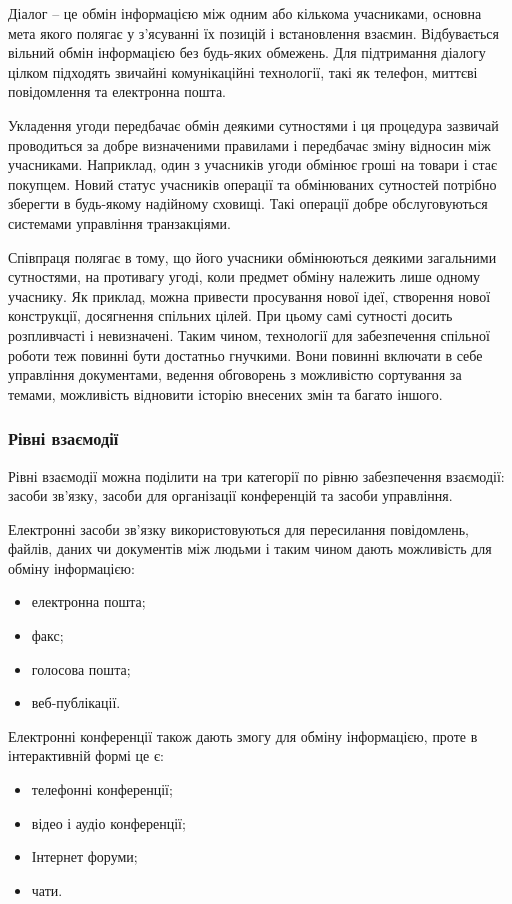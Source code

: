 \par Діалог -- це обмін інформацією між одним або кількома учасниками, основна мета якого полягає у з'ясуванні їх позицій і встановлення взаємин. 
Відбувається вільний обмін інформацією без будь-яких обмежень. 
Для підтримання діалогу цілком підходять звичайні комунікаційні технології, такі як телефон, миттєві повідомлення та електронна пошта.
\par Укладення угоди передбачає обмін деякими сутностями і ця процедура зазвичай проводиться за добре визначеними правилами і передбачає зміну відносин між учасниками. Наприклад, один з учасників угоди обмінює гроші на товари і стає покупцем. Новий статус учасників операції та обмінюваних сутностей потрібно зберегти в будь-якому надійному сховищі. Такі операції добре обслуговуються системами управління транзакціями. 
\par Співпраця полягає в тому, що його учасники обмінюються деякими загальними сутностями, на противагу угоді, коли предмет обміну належить лише одному учаснику. 
Як приклад, можна привести просування нової ідеї, створення нової конструкції, досягнення спільних цілей. 
При цьому самі сутності досить розпливчасті і невизначені. 
Таким чином, технології для забезпечення спільної роботи теж повинні бути достатньо гнучкими. 
Вони повинні включати в себе управління документами, ведення обговорень з можливістю сортування за темами, можливість відновити історію внесених змін та багато іншого.
 
\subsubsection{Рівні взаємодії}

Рівні взаємодії можна поділити на три категорії по рівню забезпечення взаємодії: засоби зв'язку, засоби для організації конференцій та засоби управління.

\par Електронні засоби зв'язку використовуються для пересилання повідомлень, файлів, даних чи документів між людьми і таким чином дають можливість для обміну інформацією:
\begin{itemize}
\item електронна пошта;
\item факс;
\item голосова пошта;
\item веб-публікації.
\end{itemize}

Електронні конференції також дають змогу для обміну інформацією, проте в інтерактивній формі це є:
\begin{itemize}
\item телефонні конференції;
\item відео і аудіо конференції;
\item Інтернет форуми;
\item чати.
\end{itemize}

